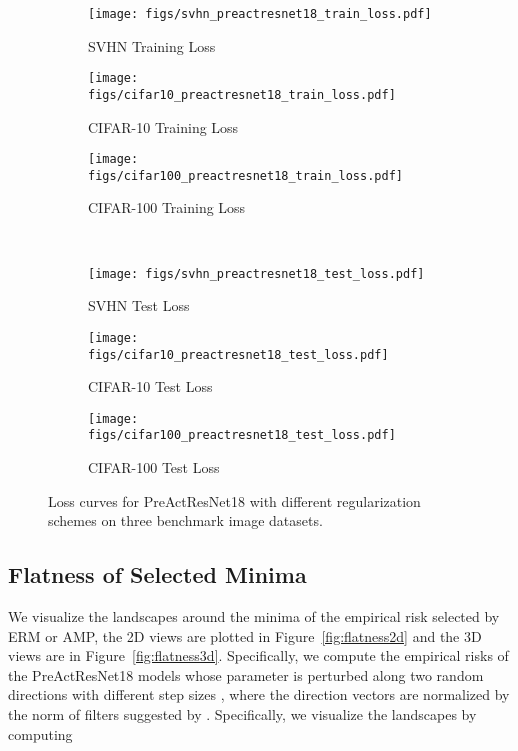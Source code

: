 \documentclass[final]{cvpr}
\begin{document}
\begin{figure*}[t]
\centering
\begin{subfigure}{0.66\columnwidth}\centering \captionsetup{width=0.9\columnwidth}\texttt{[image: figs/svhn\_preactresnet18\_train\_loss.pdf]}\caption{SVHN Training Loss}\end{subfigure}\begin{subfigure}{0.66\columnwidth}\centering \captionsetup{width=0.9\columnwidth}\texttt{[image: figs/cifar10\_preactresnet18\_train\_loss.pdf]}\caption{CIFAR-10 Training Loss}\end{subfigure}\begin{subfigure}{0.66\columnwidth}\centering \captionsetup{width=0.9\columnwidth}\texttt{[image: figs/cifar100\_preactresnet18\_train\_loss.pdf]}\caption{CIFAR-100 Training Loss}\end{subfigure}\\
\begin{subfigure}{0.66\columnwidth}\centering \captionsetup{width=0.9\columnwidth}\texttt{[image: figs/svhn\_preactresnet18\_test\_loss.pdf]}\caption{SVHN Test Loss}\end{subfigure}\begin{subfigure}{0.66\columnwidth}\centering \captionsetup{width=0.9\columnwidth}\texttt{[image: figs/cifar10\_preactresnet18\_test\_loss.pdf]}\caption{CIFAR-10 Test Loss}\end{subfigure}\begin{subfigure}{0.66\columnwidth}\centering \captionsetup{width=0.9\columnwidth}\texttt{[image: figs/cifar100\_preactresnet18\_test\_loss.pdf]}\caption{CIFAR-100 Test Loss}\end{subfigure}\caption{Loss curves for PreActResNet18 with different regularization schemes on three benchmark image datasets.}
\label{fig:loss}
\end{figure*}

\subsection{Flatness of Selected Minima}

We visualize the landscapes around the minima of the empirical risk selected by ERM or AMP, the 2D views are plotted in Figure~\ref{fig:flatness2d} and the 3D views are in Figure~\ref{fig:flatness3d}. Specifically, we compute the empirical risks of the PreActResNet18 models whose parameter is perturbed along two random directions  with different step sizes , where the direction vectors are normalized by the norm of filters suggested by \cite{li2018visualizing}. 
Specifically, we visualize the landscapes by computing
\end{document}
